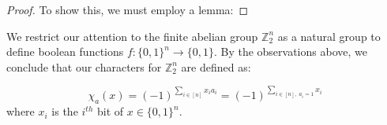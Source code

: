 \documentclass{amsart}
\theoremstyle{definition}
\theoremstyle{remark}
\newtheorem{remark}[theorem]{Remark}
\numberwithin{equation}{section}
\begin{document}
\begin{proof}
  To show this, we must employ a lemma:




\end{proof}

We restrict our attention to the finite abelian group $\mathbb{Z}_2^n$ as a natural group to define boolean functions $f: \{0,1\}^n \rightarrow \{0,1\}$. By the observations above, we conclude that our characters for $\mathbb{Z}_2^n$ are defined as:

\begin{equation}
  \chi_a(x) = (-1)^{\sum_{i \in [n]} x_ia_i} = (-1)^{\sum_{i \in [n], \; a_i = 1} x_i}
\end{equation}
where $x_i$ is the $i^{th}$ bit of $x \in \{0,1\}^n$.















\end{document}
